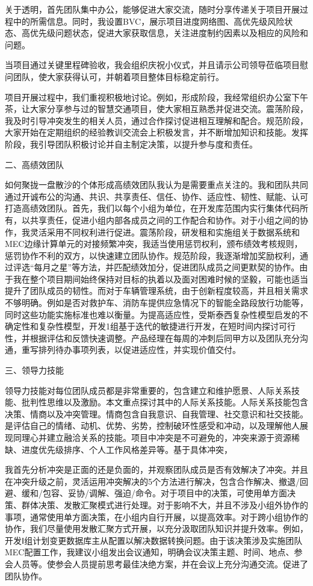 \documentclass[UTF8]{../computerUniverse}
\begin{document}
关于透明，首先团队集中办公，能够促进大家交流，随时分享传递关于项目开展过程中的所需信息。同时，我设置BVC，展示项目进度网络图、高优先级风险状态、高优先级问题状态，促进大家获取信息，关注进度制约因素以及相应的风险和问题。

当项目通过关键里程碑验收，我会组织庆祝小仪式，并且请示公司领导莅临项目慰问团队，使大家获得认可，并朝着项目整体目标稳定前行。

项目开展过程中，我们重视积极地讨论。例如，形成阶段，我经常组织办公室下午茶，让大家分享参与过的智慧交通项目，使大家相互熟悉并促进交流。震荡阶段，我及时引导冲突发生的相关人员，通过合作探讨促进相互理解和配合。规范阶段，大家开始在定期组织的经验教训交流会上积极发言，并不断增加知识和技能。发挥阶段，我引导团队积极讨论并自主制定决策，以提升参与度和责任。



二、高绩效团队

如何聚拢一盘散沙的个体形成高绩效团队我认为是需要重点关注的。我和团队共同通过开诚布公的沟通、共识、共享责任、信任、协作、适应性、韧性、赋能、认可打造高绩效团队。首先，我们以每个小组为单位，在开发库范围内实行集体代码所有，以共享责任，促进小组内部各成员之间的工作配合和协作。对于小组之间的协作，我灵活采用不同权利进行促进。震荡阶段，研发租和实施组关于数据系统和MEC边缘计算单元的对接频繁冲突，我适当使用惩罚权利，颁布绩效考核规则，惩罚协作不利的双方，以快速建立团队协作。规范阶段，我逐渐增加奖励权利，通过评选“每月之星”等方法，并匹配绩效加分，促进团队成员之间更默契的协作。由于我在整个项目期间始终保持对目标的执着以及面对困难时候的坚毅，可能也适当提升了团队成员的韧性。而对于车辆管理系统，由于创新程度较高，并且相关需求不够明确。例如是否对救护车、消防车提供应急情况下的智能全路段放行功能等，同时这些功能实施标准也难以衡量。为提高适应性，受斯泰西复杂性模型启发的不确定性和复杂性模型，开发1组基于迭代的敏捷进行开发，在短时间内探讨可行性，并根据评估和反馈快速调整。产品经理在每周的冲刺后同甲方以及团队充分沟通，重写排列待办事项列表，以促进适应性，并实现价值交付。




三、领导力技能

领导力技能对每位团队成员都是非常重要的，包含建立和维护愿景、人际关系技能、批判性思维以及激励。本文重点探讨其中的人际关系技能。人际关系技能包含决策、情商以及冲突管理。情商包含自我意识、自我管理、社交意识和社交技能。是评估自己的情绪、动机、优势、劣势，控制破环性感受和冲动，以及理解他人展现同理心并建立融洽关系的技能。项目中冲突是不可避免的，冲突来源于资源稀缺、进度优先级排序、个人工作风格差异等。基于具体冲突，

我首先分析冲突是正面的还是负面的，并观察团队成员是否有效解决了冲突。并且在冲突升级之前，灵活运用冲突解决的5个方法进行解决，包含合作解决、撤退/回避、缓和/包容、妥协/调解、强迫/命令。对于项目中的决策，可使用单方面决策、群体决策、发散汇聚模式进行处理。对于影响不大，并且不涉及小组外协作的事项，通常使用单方面决策，在小组内自行开展，以提高效率。对于跨小组协作的协作，我们尽量使用发散汇聚方式开展，以充分汲取团队知识并提升效率。例如，开发Ⅰ组计划变更数据库主从配置以解决数据转换问题。由于该决策涉及实施团队MEC配置工作，我建议小组发出会议通知，明确会议决策主题、时间、地点、参会人员等。使参会人员提前思考最佳决绝方案，并在会议上充分沟通交流。促进了团队协作。
\end{document}
